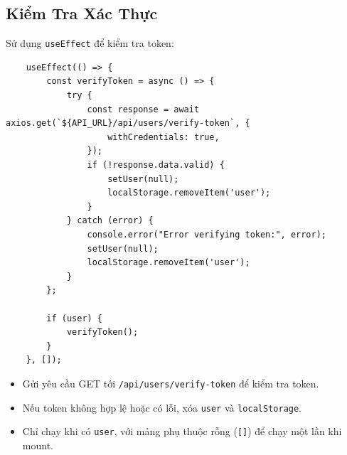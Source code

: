         \subsection{Kiểm Tra Xác Thực}
            \hspace*{0.6cm}Sử dụng \texttt{useEffect} để kiểm tra token:
            \begin{lstlisting}
    useEffect(() => {
        const verifyToken = async () => {
            try {
                const response = await axios.get(`${API_URL}/api/users/verify-token`, {
                    withCredentials: true,
                });
                if (!response.data.valid) {
                    setUser(null);
                    localStorage.removeItem('user');
                }
            } catch (error) {
                console.error("Error verifying token:", error);
                setUser(null);
                localStorage.removeItem('user');
            }
        };

        if (user) {
            verifyToken();
        }
    }, []);
            \end{lstlisting}
            \begin{itemize}
                \item Gửi yêu cầu GET tới \texttt{/api/users/verify-token} để kiểm tra token.
                \item Nếu token không hợp lệ hoặc có lỗi, xóa \texttt{user} và \texttt{localStorage}.
                \item Chỉ chạy khi có \texttt{user}, với mảng phụ thuộc rỗng (\texttt{[]}) để chạy một lần khi mount.
            \end{itemize}

